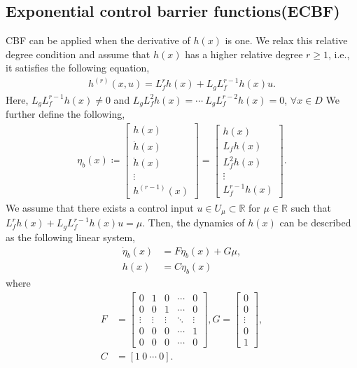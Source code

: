 \subsection{Exponential control barrier functions(ECBF)}
\label{sec:ECBF}
CBF can be applied when the derivative of $ h(x) $ is one.
We relax this relative degree condition and assume that $ h(x) $ has a higher relative degree $ r \geq 1 $, i.e., it satisfies the following equation,
\begin{align}
    \label{eq:h_relative_degree}
    h^{(r)}(x,u) = L_f^r h(x) + L_g L_f^{r-1} h(x)u.
\end{align}
Here, $L_g L_f^{r-1} h(x) \neq 0 $ and $ L_g L_f^2 h(x) = \cdots ~ L_g L_f^{r-2} h(x) = 0 $, $ \forall x \in D $
We further define the following,
\begin{align}
    \label{eq:definition_of_eta_b}
    \eta_b(x) \coloneqq
    \begin{bmatrix}
        h(x) \\
        \dot{h}(x) \\
        \ddot{h}(x) \\
        \vdots \\
        h^{(r-1)}(x)
    \end{bmatrix}
    =
    \begin{bmatrix}
        h(x) \\
        L_f h(x) \\
        L_f^2 h(x) \\
        \vdots \\
        L_f^{r-1} h(x)
    \end{bmatrix}.
\end{align}
We assume that there exists a control input $ u \in U_{\mu} \subset \mathbb{R} $ for $ \mu \in \mathbb{R} $ such that $ L_f^r h(x) + L_g L_f^{r-1} h(x) u = \mu $.
Then, the dynamics of $ h(x) $ can be described as the following linear system,
\begin{align}
    \label{eq:linear_system_of_h}
    \dot{\eta}_b(x) &= F \eta_b(x) + G \mu, \\
    h(x) &= C \eta_b (x)
\end{align}
where
\begin{align}
    \label{eq:definition_of_F_G_C}
    F &= 
    \begin{bmatrix}
        0 & 1 & 0 & \cdots & 0 \\
        0 & 0 & 1 & \cdots & 0 \\
        \vdots & \vdots & \vdots & \ddots & \vdots \\
        0 & 0 & 0 & \cdots & 1 \\
        0 & 0 & 0 & \cdots & 0
    \end{bmatrix},
    G = 
    \begin{bmatrix}
        0 \\
        0 \\
        \vdots \\
        0 \\
        1   
    \end{bmatrix}, \\
    C &= [1 ~ 0 ~ \cdots ~ 0].
\end{align}
